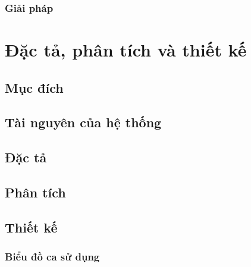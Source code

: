 \documentclass[11pt]{report}
\begin{document}
\subsection*{Giải pháp}



\chapter{Đặc tả, phân tích và thiết kế}

\section*{Mục đích}

\section*{Tài nguyên của hệ thống}
\blindtext

\section{Đặc tả}


\section{Phân tích}


\section{Thiết kế}

\subsection{Biểu đồ ca sử dụng}

\end{document}
